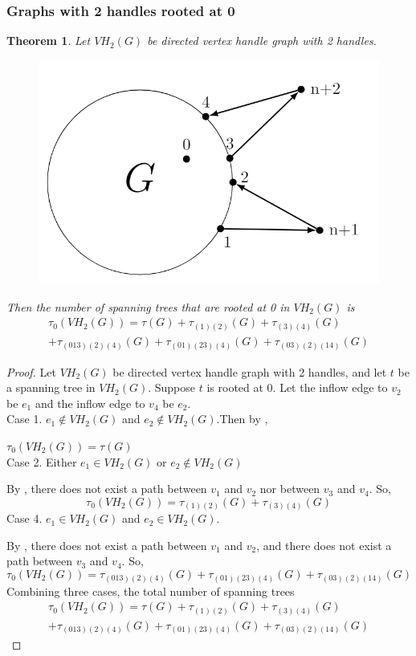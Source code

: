 \documentclass[twoside,11pt]{article}
\newtheorem{theorem}{Theorem}[section]
\numberwithin{equation}{section} \DeclareMathOperator{\Var}{Var}
\newcommand{\bpf}{\begin{proof}}
\newcommand{\epf}{\end{proof}}
\newcommand{\bthm}{\begin{theorem}}
\newcommand{\ethm}{\end{theorem}}
\begin{document}
\subsubsection{Graphs with 2 handles rooted at 0}
\bthm
Let $VH_2(G)$ be directed vertex handle graph with 2 handles.
\begin{figure}[H]
    \centering
    \includegraphics[scale=0.4]{tik_2handles.PNG}
\end{figure}
Then the number of spanning trees that are rooted at 0 in $VH_2(G)$ is
\begin{multline*}
\tau_0(VH_2(G)) = \tau(G) + \tau_{(1)(2)}(G)+ \tau_{(3)(4)}(G)\\ + \tau_{(013)(2)(4)}(G) + \tau_{(01)(23)(4)}(G) + \tau_{(03)(2)(14)}(G)
\end{multline*}
\ethm

\bpf
Let $VH_2(G)$ be directed vertex handle graph with 2 handles, and let $t$ be a spanning tree in $VH_2(G)$. Suppose $t$ is rooted at 0. Let the inflow edge to $v_2$ be $e_1$ and the inflow edge to $v_4$ be $e_2$.\\
Case 1. $e_1 \notin VH_2(G)$ and $e_2 \notin VH_2(G)$.Then by ,

$\tau_0(VH_2(G))=\tau(G)$\\
Case 2. Either $e_1 \in VH_2(G)$ or $e_2 \notin VH_2(G)$

By , there does not exist a path between $v_1$ and $v_2$ nor between $v_3$ and $v_4$. So,
$$\tau_0(VH_2(G))=\tau_{(1)(2)}(G)+ \tau_{(3)(4)}(G)$$ 
Case 4. $e_1\in VH_2(G)$ and $e_2 \in VH_2(G)$.

By , there does not exist a path between $v_1$ and $v_2$, and there does not exist a path between $v_3$ and $v_4$. So, $$\tau_0(VH_2(G))=\tau_{(013)(2)(4)}(G) + \tau_{(01)(23)(4)}(G) + \tau_{(03)(2)(14)}(G)$$
Combining three cases, the total number of spanning trees
\begin{multline*}
\tau_0(VH_2(G)) = \tau(G) + \tau_{(1)(2)}(G)+ \tau_{(3)(4)}(G)\\ + \tau_{(013)(2)(4)}(G) + \tau_{(01)(23)(4)}(G) + \tau_{(03)(2)(14)}(G)
\end{multline*}
\epf
\end{document}
